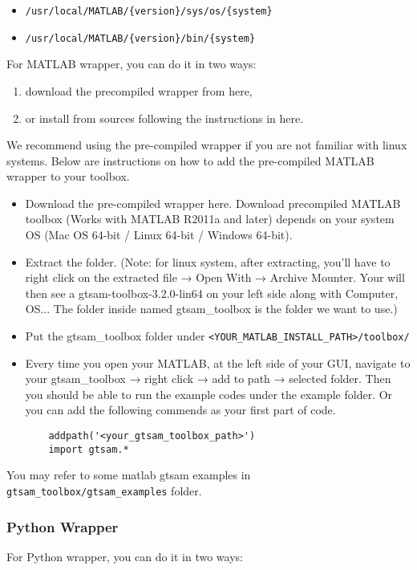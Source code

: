 \documentclass{article}
\begin{document}
\begin{itemize}
    \item \texttt{/usr/local/MATLAB/\{version\}/sys/os/\{system\}}
    \item \texttt{/usr/local/MATLAB/\{version\}/bin/\{system\}}
\end{itemize}

For MATLAB wrapper, you can do it in two ways:

\begin{enumerate}
    \item download the precompiled wrapper from here,
    \item or install from sources following the instructions in here.
\end{enumerate}

We recommend using the pre-compiled wrapper if you are not familiar with linux systems. Below are instructions on how to add the pre-compiled MATLAB wrapper to your toolbox.

\begin{itemize}
    \item Download the pre-compiled wrapper here. Download precompiled MATLAB toolbox (Works with MATLAB R2011a and later) depends on your system OS (Mac OS 64-bit / Linux 64-bit / Windows 64-bit).
    \item Extract the folder. (Note: for linux system, after extracting, you'll have to right click on the extracted file → Open With → Archive Mounter. Your will then see a gtsam-toolbox-3.2.0-lin64 on your left side along with Computer, OS... The folder inside named gtsam\_toolbox is the folder we want to use.)
    \item Put the gtsam\_toolbox folder under \texttt{<YOUR\_MATLAB\_INSTALL\_PATH>/toolbox/}
    \item Every time you open your MATLAB, at the left side of your GUI, navigate to your gtsam\_toolbox → right click → add to path → selected folder. Then you should be able to run the example codes under the example folder. Or you can add the following commends as your first part of code.
    \begin{verbatim}
    addpath('<your_gtsam_toolbox_path>')
    import gtsam.*
    \end{verbatim}
\end{itemize}

You may refer to some matlab gtsam examples in \texttt{gtsam\_toolbox/gtsam\_examples} folder.

\subsubsection{Python Wrapper}
For Python wrapper, you can do it in two ways:
\end{document}
